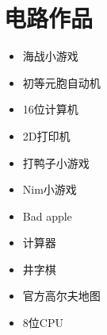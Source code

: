 \section{电路作品}
\begin{itemize}
\item 海战小游戏 
\item 初等元胞自动机 
\item 16位计算机 
\item 2D打印机 
\item 打鸭子小游戏 
\item Nim小游戏 
\item Bad apple 
\item 计算器 
\item 井字棋 
\item 官方高尔夫地图 
\item 8位CPU 
\end{itemize}

